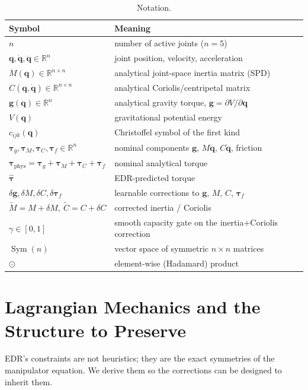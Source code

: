 \documentclass[11pt]{article}
\newcommand{\R}{\mathbb{R}}
\newcommand{\q}{\bm{q}}
\newcommand{\qd}{\dot{\bm{q}}}
\newcommand{\qdd}{\ddot{\bm{q}}}
\newcommand{\tphys}{\bm{\tau}_{\mathrm{phys}}}
\newcommand{\that}{\hat{\bm{\tau}}}
\newcommand{\tg}{\bm{\tau}_g}
\newcommand{\tM}{\bm{\tau}_M}
\newcommand{\tC}{\bm{\tau}_C}
\newcommand{\tf}{\bm{\tau}_f}
\newcommand{\dg}{\delta\bm{g}}
\newcommand{\dM}{\delta\!M}
\newcommand{\dC}{\delta C}
\newcommand{\dtf}{\delta\bm{\tau}_f}
\newcommand{\Mmat}{M}
\newcommand{\Cmat}{C}
\newcommand{\Mt}{\tilde{M}}
\newcommand{\Ct}{\tilde{C}}
\DeclareMathOperator{\Symop}{Sym}
\theoremstyle{definition}
\theoremstyle{plain}
\begin{document}
\begin{table}[t]
\centering\small
\renewcommand{\arraystretch}{1.18}
\begin{tabular}{@{}l l@{}}
\toprule
Symbol & Meaning \\
\midrule
$n$ & number of active joints ($n=5$)\\
$\q,\qd,\qdd\in\R^{n}$ & joint position, velocity, acceleration\\
$\Mmat(\q)\in\R^{n\times n}$ & analytical joint-space inertia matrix (SPD)\\
$\Cmat(\q,\qd)\in\R^{n\times n}$ & analytical Coriolis/centripetal matrix\\
$\bm{g}(\q)\in\R^{n}$ & analytical gravity torque, $\bm g=\partial V/\partial\q$\\
$V(\q)$ & gravitational potential energy\\
$c_{ijk}(\q)$ & Christoffel symbol of the first kind\\
$\tg,\tM,\tC,\tf\in\R^{n}$ & nominal components $\bm g$, $\Mmat\qdd$, $\Cmat\qd$, friction\\
$\tphys=\tg+\tM+\tC+\tf$ & nominal analytical torque\\
$\that$ & EDR-predicted torque\\
$\dg,\dM,\dC,\dtf$ & learnable corrections to $\bm g$, $\Mmat$, $\Cmat$, $\tf$\\
$\Mt=\Mmat+\dM,\ \Ct=\Cmat+\dC$ & corrected inertia / Coriolis\\
$\gamma\in[0,1]$ & smooth capacity gate on the inertia$+$Coriolis correction\\
$\Symop(n)$ & vector space of symmetric $n\times n$ matrices\\
$\odot$ & element-wise (Hadamard) product\\
\bottomrule
\end{tabular}
\caption{Notation.}
\label{tab:notation}
\end{table}

\section{Lagrangian Mechanics and the Structure to Preserve}
\label{sec:lagrangian}
EDR's constraints are not heuristics; they are the exact symmetries of the
manipulator equation. We derive them so the corrections can be designed to inherit
them.
\end{document}
